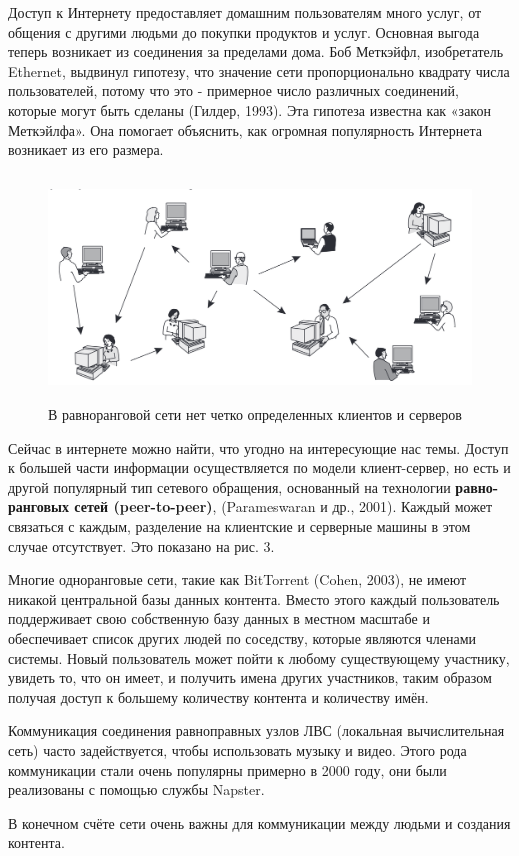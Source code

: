 	\par Доступ к Интернету предоставляет домашним пользователям много услуг, от общения с другими людьми до покупки продуктов и услуг. Основная выгода теперь возникает из соединения за пределами дома. Боб Меткэйфл, изобретатель Ethernet, выдвинул гипотезу, что значение сети пропорционально квадрату числа пользователей, потому что это - примерное число различных соединений, которые могут быть сделаны (Гилдер, 1993). Эта гипотеза известна как «закон Меткэйлфа». Она помогает объяснить, как огромная популярность Интернета возникает из его размера.
	
	\begin{figure}[h]
		\centering
		\includegraphics[height=6cm]{img/1.3} 
		\captionsetup{font=footnotesize}
		\caption{В равноранговой сети нет четко определенных клиентов и серверов} 
	\end{figure}
	
	\par Сейчас в интернете можно найти, что угодно на интересующие нас темы. Доступ к большей части информации осуществляется по модели клиент-сервер, но есть и другой популярный тип сетевого обращения, основанный на технологии \textbf{равно-ранговых сетей (peer-to-peer)}, (Parameswaran и др., 2001). Каждый может связаться с каждым, разделение на клиентские и серверные машины в этом случае отсутствует. Это показано на рис. 3. 
	
	\par Многие одноранговые сети, такие как BitTorrent (Cohen, 2003), не имеют никакой центральной базы данных контента. Вместо этого каждый пользователь поддерживает свою собственную базу данных в  местном масштабе и обеспечивает список других людей по соседству, которые являются членами системы. Новый пользователь может пойти к любому существующему участнику, увидеть то, что он имеет, и получить имена других участников, таким образом получая доступ к большему количеству контента и количеству имён. 
	
	\par Коммуникация соединения равноправных узлов ЛВС (локальная вычислительная сеть) часто  задействуется, чтобы использовать музыку и видео. Этого рода коммуникации стали очень популярны примерно в 2000 году, они были реализованы с помощью службы Napster. 
	
	\par В конечном счёте сети очень важны для коммуникации между людьми и создания контента. 
	
    \par 


	

	
